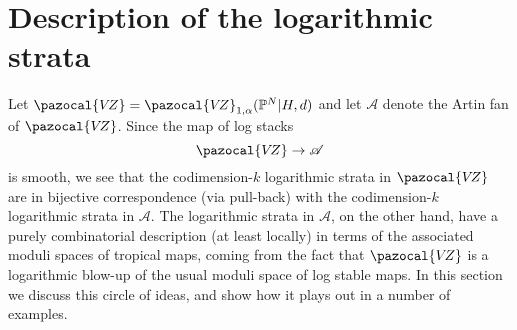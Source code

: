 \documentclass[11pt]{amsart}
\newcommand{\PP}{\mathbb P}
\newcommand{\VZ}{\pazocal{V\!Z}}
\renewcommand{\to}{\rightarrow}
\newcommand{\Acal}{\mathcal{A}}
\theoremstyle{definition}
\theoremstyle{definition}
\begin{document}
\section{Description of the logarithmic strata}
\noindent Let $\VZ = \VZ_{1,\alpha}(\PP^N|H,d)$ and let $\Acal$ denote the Artin fan of $\VZ$. Since the map of log stacks
\begin{equation*} \VZ \to \Acal \end{equation*}
is smooth, we see that the codimension-$k$ logarithmic strata in $\VZ$ are in bijective correspondence (via pull-back) with the codimension-$k$ logarithmic strata in $\Acal$. The logarithmic strata in $\Acal$, on the other hand, have a purely combinatorial description (at least locally) in terms of the associated moduli spaces of tropical maps, coming from the fact that $\VZ$ is a logarithmic blow-up of the usual moduli space of log stable maps. In this section we discuss this circle of ideas, and show how it plays out in a number of examples.
\end{document}

